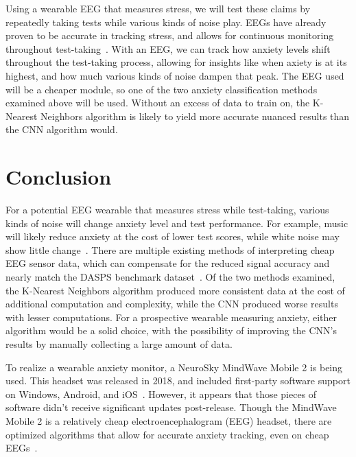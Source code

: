 \documentclass[journal]{IEEEtran}
\begin{document}
Using a wearable EEG that measures stress, we will test these claims by repeatedly taking tests while various kinds of noise play. EEGs have already proven to be accurate in tracking stress, and allows for continuous monitoring throughout test-taking~\cite{ChatterjeeDebatri2023Doms}. With an EEG, we can track how anxiety levels shift throughout the test-taking process, allowing for insights like when axiety is at its highest, and how much various kinds of noise dampen that peak. The EEG used will be a cheaper module, so one of the two anxiety classification methods examined above will be used. Without an excess of data to train on, the K-Nearest Neighbors algorithm is likely to yield more accurate nuanced results than the CNN algorithm would.

\section{Conclusion}
For a potential EEG wearable that measures stress while test-taking, various kinds of noise will change anxiety level and test performance. For example, music will likely reduce anxiety at the cost of lower test scores, while white noise may show little change~\cite{ShahrokhiShabnam2022Teow}. There are multiple existing methods of interpreting cheap EEG sensor data, which can compensate for the reduced signal accuracy and nearly match the DASPS benchmark dataset~\cite{ChatterjeeDebatri2023Doms, GhonchiHamidreza2025MMCA}. Of the two methods examined, the K-Nearest Neighbors algorithm produced more consistent data at the cost of additional computation and complexity, while the CNN produced worse results with lesser computations. For a prospective wearable measuring anxiety, either algorithm would be a solid choice, with the possibility of improving the CNN's results by manually collecting a large amount of data.


To realize a wearable anxiety monitor, a NeuroSky MindWave Mobile 2 is being used. This headset was released in 2018, and included first-party software support on Windows, Android, and iOS~\cite{neurosky2018mwm2}. However, it appears that those pieces of software didn't receive significant updates post-release. Though the MindWave Mobile 2 is a relatively cheap electroencephalogram (EEG) headset, there are optimized algorithms that allow for accurate anxiety tracking, even on cheap EEGs~\cite{ChatterjeeDebatri2023Doms}.
\end{document}
